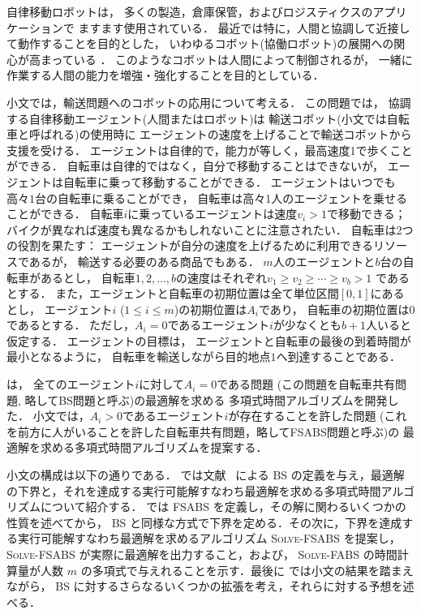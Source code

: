 
自律移動ロボットは，
多くの製造，倉庫保管，およびロジスティクスのアプリケーションで
ますます使用されている．
最近では特に，人間と協調して近接して動作することを目的とした，
いわゆるコボット(協働ロボット)の展開への関心が高まっている \cite{4154820,wiki,6386300}．
このようなコボットは人間によって制御されるが，
一緒に作業する人間の能力を増強・強化することを目的としている．

小文では，輸送問題へのコボットの応用について考える．
この問題では，
協調する自律移動エージェント(人間またはロボット)は
輸送コボット(小文では自転車と呼ばれる)の使用時に
エージェントの速度を上げることで輸送コボットから支援を受ける．
エージェントは自律的で，能力が等しく，最高速度1で歩くことができる．
自転車は自律的ではなく，自分で移動することはできないが，
エージェントは自転車に乗って移動することができる．
エージェントはいつでも高々$1$台の自転車に乗ることができ，
自転車は高々1人のエージェントを乗せることができる．
自転車$i$に乗っているエージェントは速度$v_i>1$で移動できる；
バイクが異なれば速度も異なるかもしれないことに注意されたい．
自転車は2つの役割を果たす：
エージェントが自分の速度を上げるために利用できるリソースであるが，
輸送する必要のある商品でもある．
$m$人のエージェントと$b$台の自転車があるとし，
自転車$1,2,\ldots,b$の速度はそれぞれ$v_1\ge v_2\ge\cdots\ge v_b>1$
であるとする．
また，エージェントと自転車の初期位置は全て単位区間$[0,1]$にあるとし，
エージェント$i$ ($1\le i\le m$)の初期位置は$A_i$であり，
自転車の初期位置は$0$であるとする．
ただし，$A_i=0$であるエージェント$i$が少なくとも$b+1$人いると仮定する．
エージェントの目標は，
エージェントと自転車の最後の到着時間が最小となるように，
自転車を輸送しながら目的地点$1$へ到達することである．

\textcite{czyzowicz} は，
全てのエージェント$i$に対して$A_i=0$である問題
(この問題を自転車共有問題, 略してBS問題と呼ぶ)の最適解を求める
多項式時間アルゴリズムを開発した．
小文では，$A_i>0$であるエージェント$i$が存在することを許した問題
(これを前方に人がいることを許した自転車共有問題，略してFSABS問題と呼ぶ)の
最適解を求める多項式時間アルゴリズムを提案する．

小文の構成は以下の通りである． では文献~\cite{czyzowicz} による BS の定義を与え，最適解の下界と，それを達成する実行可能解すなわち最適解を求める多項式時間アルゴリズムについて紹介する． では FSABS を定義し，その解に関わるいくつかの性質を述べてから， BS と同様な方式で下界を定める．その次に，下界を達成する実行可能解すなわち最適解を求めるアルゴリズム \textsc{Solve-FSABS} を提案し， \textsc{Solve-FSABS} が実際に最適解を出力すること，および， \textsc{Solve-FABS} の時間計算量が人数 $m$ の多項式で与えれることを示す．最後に  では小文の結果を踏まえながら， BS に対するさらなるいくつかの拡張を考え，それらに対する予想を述べる．

